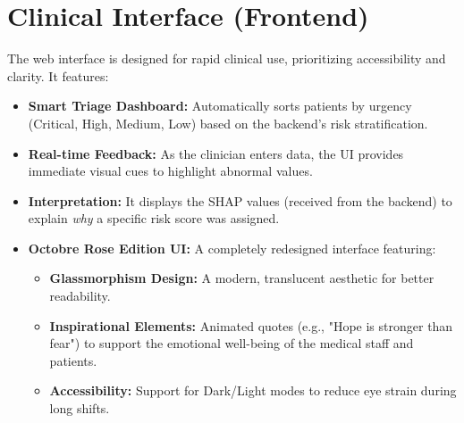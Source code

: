 \section{Clinical Interface (Frontend)}
The web interface is designed for rapid clinical use, prioritizing accessibility and clarity. It features:
\begin{itemize}
    \item \textbf{Smart Triage Dashboard:} Automatically sorts patients by urgency (Critical, High, Medium, Low) based on the backend's risk stratification.
    \item \textbf{Real-time Feedback:} As the clinician enters data, the UI provides immediate visual cues to highlight abnormal values.
    \item \textbf{Interpretation:} It displays the SHAP values (received from the backend) to explain \textit{why} a specific risk score was assigned.
    \item \textbf{Octobre Rose Edition UI:} A completely redesigned interface featuring:
    \begin{itemize}
        \item \textbf{Glassmorphism Design:} A modern, translucent aesthetic for better readability.
        \item \textbf{Inspirational Elements:} Animated quotes (e.g., "Hope is stronger than fear") to support the emotional well-being of the medical staff and patients.
        \item \textbf{Accessibility:} Support for Dark/Light modes to reduce eye strain during long shifts.
    \end{itemize}
\end{itemize}


